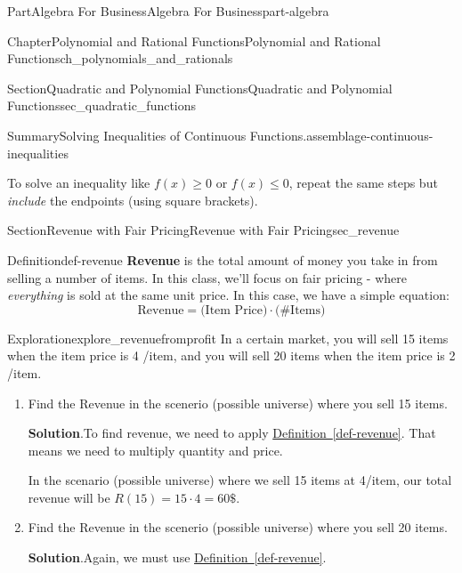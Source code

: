 \documentclass[oneside,10pt,]{tufte-book}
\newcommand{\blocktitlefont}{\relax}
\newcommand{\xreffont}{\relax}
\newcommand{\terminology}[1]{\textbf{#1}}
\numberwithin{equation}{chapter}
\begin{document}
\begin{partptx}{Part}{Algebra For Business}{}{Algebra For Business}{}{}{part-algebra}
\begin{chapterptx}{Chapter}{Polynomial and Rational Functions}{}{Polynomial and Rational Functions}{}{}{ch_polynomials_and_rationals}
\begin{sectionptx}{Section}{Quadratic and Polynomial Functions}{}{Quadratic and Polynomial Functions}{}{}{sec_quadratic_functions}
\begin{assemblage}{Summary}{Solving Inequalities of Continuous Functions.}{assemblage-continuous-inequalities}
\begin{enumerate}
\end{enumerate}
%
\par
To solve an inequality like \(f(x)\geq 0\) or \(f(x)\leq 0\), repeat the same steps but \emph{include} the endpoints (using square brackets).%
\end{assemblage}
\end{sectionptx}
%
%
\typeout{************************************************}
\typeout{************************************************}
%
\begin{sectionptx}{Section}{Revenue with Fair Pricing}{}{Revenue with Fair Pricing}{}{}{sec_revenue}
\begin{definition}{Definition}{}{def-revenue}%
\terminology{Revenue} is the total amount of money you take in from selling a number of items. In this class, we'll focus on fair pricing - where \emph{everything} is sold at the same unit price. In this case, we have a simple equation:%
\begin{equation*}
\text{Revenue} = \Big(\text{Item Price}\Big) \cdot \Big(\text{\# Items}\Big)
\end{equation*}
%
\end{definition}
\begin{exploration}{Exploration}{}{explore_revenuefromprofit}%
In a certain market, you will sell 15 items when the item price is 4 \textdollar{}\slash{}item, and you will sell 20 items when the item price is 2 \textdollar{}\slash{}item.%
\begin{enumerate}[font=\bfseries,label=(\alph*),ref=\alph*]%
\item{}Find the Revenue in the scenerio (possible universe) where you sell 15 items.%
\par\smallskip%
\noindent\textbf{\blocktitlefont Solution}.\hypertarget{explore_revenuefromprofit-2-2}{}\quad{}To find revenue, we need to apply \hyperref[def-revenue]{Definition~{\xreffont\ref{def-revenue}}}.  That means we need to multiply quantity and price.%
\par
In the scenario (possible universe) where we sell 15 items at 4\textdollar{}\slash{}item, our total revenue will be \(R(15) = 15\cdot 4 = 60\$\).%
\item{}Find the Revenue in the scenerio (possible universe) where you sell 20 items.%
\par\smallskip%
\noindent\textbf{\blocktitlefont Solution}.\hypertarget{explore_revenuefromprofit-3-2}{}\quad{}Again, we must use \hyperref[def-revenue]{Definition~{\xreffont\ref{def-revenue}}}.%

\end{enumerate}
\end{exploration}
\end{sectionptx}
\end{chapterptx}
\end{partptx}
\end{document}
